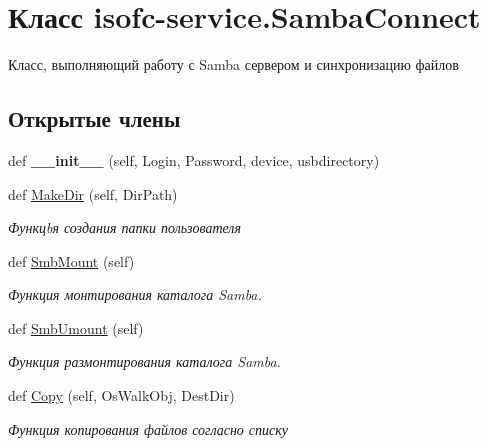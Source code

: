 \hypertarget{classisofc-service_1_1SambaConnect}{}\section{Класс isofc-\/service.Samba\+Connect}
\label{classisofc-service_1_1SambaConnect}


Класс, выполняющий работу с Samba сервером и синхронизацию файлов  


\subsection*{Открытые члены}
\begin{DoxyCompactItemize}
\item 
\mbox{\label{classisofc-service_1_1SambaConnect_a1f6c9a61dea2855ea0b683beeade8982}} 
def {\bfseries \+\_\+\+\_\+init\+\_\+\+\_\+} (self, Login, Password, device, usbdirectory)
\item 
def \mbox{\hyperlink{classisofc-service_1_1SambaConnect_a256854c09eac2ddc8f3d50d616a0a143}{Make\+Dir}} (self, Dir\+Path)
\begin{DoxyCompactList}\small\item\em Функцbя создания папки пользователя \end{DoxyCompactList}\item 
def \mbox{\hyperlink{classisofc-service_1_1SambaConnect_a95a21d63db6f88fd43eb6a8958bb174d}{Smb\+Mount}} (self)
\begin{DoxyCompactList}\small\item\em Функция монтирования каталога Samba. \end{DoxyCompactList}\item 
def \mbox{\hyperlink{classisofc-service_1_1SambaConnect_a3979f8cc410218f1a71d44f340d1cdf8}{Smb\+Umount}} (self)
\begin{DoxyCompactList}\small\item\em Функция размонтирования каталога Samba. \end{DoxyCompactList}\item 
def \mbox{\hyperlink{classisofc-service_1_1SambaConnect_adb0efabb0957a5edadce147d74e275b0}{Copy}} (self, Os\+Walk\+Obj, Dest\+Dir)
\begin{DoxyCompactList}\small\item\em Функция копирования файлов согласно списку \end{DoxyCompactList}\item 

\end{DoxyCompactItemize}
